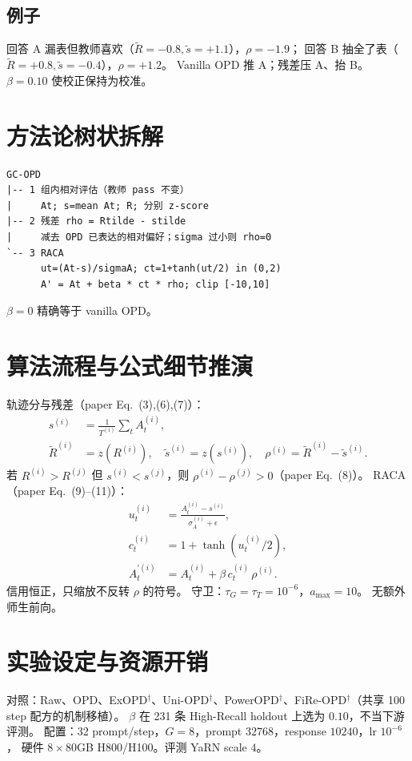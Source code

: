 \documentclass[11pt,a4paper]{ctexart}
\begin{document}
\subsection{例子}
回答 A 漏表但教师喜欢（$\tilde R=-0.8,\tilde s=+1.1$），$\rho=-1.9$；
回答 B 抽全了表（$\tilde R=+0.8,\tilde s=-0.4$），$\rho=+1.2$。
Vanilla OPD 推 A；残差压 A、抬 B。$\beta=0.10$ 使校正保持为校准。

\section{方法论树状拆解}
\begin{verbatim}
GC-OPD
|-- 1 组内相对评估（教师 pass 不变）
|     At; s=mean At; R; 分别 z-score
|-- 2 残差 rho = Rtilde - stilde
|     减去 OPD 已表达的相对偏好；sigma 过小则 rho=0
`-- 3 RACA
      ut=(At-s)/sigmaA; ct=1+tanh(ut/2) in (0,2)
      A' = At + beta * ct * rho; clip [-10,10]
\end{verbatim}
$\beta=0$ 精确等于 vanilla OPD。

\section{算法流程与公式细节推演}
轨迹分与残差（paper Eq.~(3),(6),(7)）：
\begin{align}
s^{(i)}&=\frac1{T^{(i)}}\sum_{t}A_t^{(i)},\\
\tilde R^{(i)}&=z(R^{(i)}),\quad
\tilde s^{(i)}=z(s^{(i)}),\quad
\rho^{(i)}=\tilde R^{(i)}-\tilde s^{(i)}.
\end{align}
若 $R^{(i)}>R^{(j)}$ 但 $s^{(i)}<s^{(j)}$，则 $\rho^{(i)}-\rho^{(j)}>0$（paper Eq.~(8)）。
RACA（paper Eq.~(9)--(11)）：
\begin{align}
u_t^{(i)}&=\frac{A_t^{(i)}-s^{(i)}}{\sigma_A^{(i)}+\epsilon},\\
c_t^{(i)}&=1+\tanh(u_t^{(i)}/2),\\
A_t^{\prime(i)}&=A_t^{(i)}+\beta\,c_t^{(i)}\,\rho^{(i)}.
\end{align}
信用恒正，只缩放不反转 $\rho$ 的符号。
守卫：$\tau_G=\tau_T=10^{-6}$，$a_{\max}=10$。
无额外师生前向。

\section{实验设定与资源开销}
对照：Raw、OPD、ExOPD$^\dagger$、Uni-OPD$^\dagger$、PowerOPD$^\dagger$、FiRe-OPD$^\dagger$（共享 100 step 配方的机制移植）。
$\beta$ 在 231 条 High-Recall holdout 上选为 $0.10$，不当下游评测。
配置：32 prompt/step，$G=8$，prompt $32768$，response $10240$，lr $10^{-6}$，
硬件 $8\times 80$GB H800/H100。评测 YaRN scale $4$。
\end{document}
